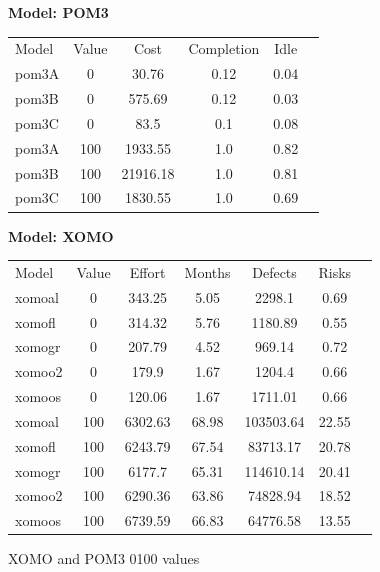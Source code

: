 \documentclass[11pt,twocolumn]{article}
\begin{document}
\begin{figure}[!t]

{\scriptsize
{\bf Model: POM3}
{\scriptsize \begin{tabular}{l@{~~~}c@{~~~}c@{~~~}c@{~~~}c@{~~~}c}
\arrayrulecolor{darkgray}
\rowcolor[gray]{.7}  Model & Value & Cost & Completion & Idle \\ 
pom3A & 0 & 30.76 & 0.12 & 0.04  \\
pom3B & 0 & 575.69 & 0.12 & 0.03  \\
pom3C & 0 & 83.5 & 0.1 & 0.08  \\
pom3A & 100 & 1933.55 & 1.0 & 0.82  \\
pom3B & 100 & 21916.18 & 1.0 & 0.81  \\
pom3C & 100 & 1830.55 & 1.0 & 0.69  \\ 
\end{tabular}}
}

{\scriptsize
{\bf Model: XOMO}
{\scriptsize \begin{tabular}{l@{~~~}c@{~~~}c@{~~~}c@{~~~}c@{~~~}c@{~~~}c}
\arrayrulecolor{darkgray}
\rowcolor[gray]{.7} Model & Value & Effort & Months & Defects & Risks \\ 
xomoal & 0 & 343.25 & 5.05 & 2298.1 & 0.69  \\
xomofl & 0 & 314.32 & 5.76 & 1180.89 & 0.55  \\
xomogr & 0 & 207.79 & 4.52 & 969.14 & 0.72  \\
xomoo2 & 0 & 179.9 & 1.67 & 1204.4 & 0.66  \\
xomoos & 0 & 120.06 & 1.67 & 1711.01 & 0.66  \\
xomoal & 100 & 6302.63 & 68.98 & 103503.64 & 22.55  \\
xomofl & 100 & 6243.79 & 67.54 & 83713.17 & 20.78  \\
xomogr & 100 & 6177.7 & 65.31 & 114610.14 & 20.41  \\
xomoo2 & 100 & 6290.36 & 63.86 & 74828.94 & 18.52  \\
xomoos & 100 & 6739.59 & 66.83 & 64776.58 & 13.55  \\ 
\end{tabular}}
}
\caption{XOMO and POM3 0100 values}\label{fig:xomopom100}
\end{figure}
\end{document}

